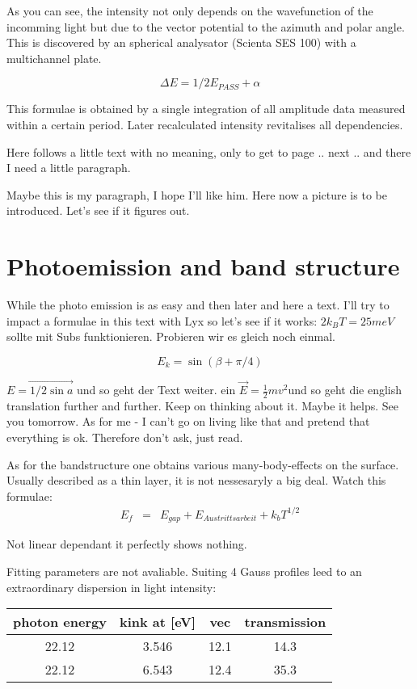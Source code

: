 \documentclass[12pt,oneside,english]{book}
\begin{document}
As you can see, the intensity not only depends on the wavefunction
of the incomming light but due to the vector potential to the azimuth
and polar angle. This is discovered by an spherical analysator (Scienta
SES 100) with a multichannel plate.

\[\Delta E=1/2E_{PASS}+\alpha\]

This formulae is obtained by a single integration of all amplitude
data measured within a certain period. Later recalculated intensity
revitalises all dependencies. 

Here follows a little text with no meaning, only to get to page ..
next .. and there I need a little paragraph.

Maybe this is my paragraph, I hope I'll like him. Here now a picture
is to be introduced. Let's see if it figures out.


\section{Photoemission and band structure}

While the photo emission is as easy and then later and here a text.
I'll try to impact a formulae in this text with Lyx so let's see if
it works: $2k_{B}T=25meV$ sollte mit Subs funktionieren. Probieren
wir es gleich noch einmal.

\[E_{k}=\sin(\beta+\pi/4)\]

$\vec{E=1/2\sin a}$ und so geht der Text weiter. ein $\vec{E}=\frac{1}{2}mv^{2}$und
so geht die english translation further and further. Keep on thinking
about it. Maybe it helps. See you tomorrow. As for me - I can't go
on living like that and pretend that everything is ok. Therefore don't
ask, just read.

As for the bandstructure one obtains various many-body-effects on
the surface. Usually described as a thin layer, it is not nessesaryly
a big deal. Watch this formulae:
\begin{eqnarray*}
E_{f} & = & E_{gap}+E_{Austrittsarbeit}+k_{b}T^{1/2}
\end{eqnarray*}


Not linear dependant it perfectly shows nothing.

Fitting parameters are not avaliable. Suiting 4 Gauss profiles leed
to an extraordinary dispersion in light intensity:

\begin{center}
\begin{tabular}{|c|c|c|c|}
\hline 
photon energy&
kink at {[}eV{]}&
vec&
transmission\tabularnewline
\hline
\hline 
22.12&
3.546&
12.1&
14.3\tabularnewline
\hline 
22.12&
6.543&
12.4&
35.3\tabularnewline
\hline
\end{tabular}
\end{center}
\end{document}
